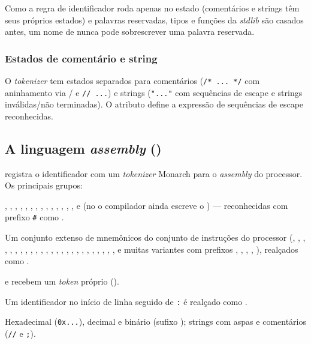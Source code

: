 \noindent
Como a regra de identificador roda apenas no estado  (comentários e
strings têm seus próprios estados) e palavras reservadas, tipos e funções da
\emph{stdlib} são casados antes, um nome de  nunca pode
sobrescrever uma palavra reservada.

\subsubsection{Estados de comentário e string}

O \emph{tokenizer} \cmm{} tem estados separados para comentários
(\lstinline|/* ... */| com aninhamento via / e
\lstinline|// ...|) e strings (\lstinline|"..."| com sequências de escape e
strings inválidas/não terminadas). O atributo  define a expressão
de sequências de escape reconhecidas.

\subsection{A linguagem \emph{assembly} ()}
\label{sec:editor-asm}

 registra o identificador  com um \emph{tokenizer}
Monarch para o \emph{assembly} do processor. Os principais grupos:

\begin{description}[leftmargin=*]
  \item[Diretivas.] , , , ,
        , , , ,
        , , , , ,
        ,  e  (no  o compilador
        ainda escreve o ) --- reconhecidas com prefixo \lstinline|#| como
        .
  \item[Instruções.] Um conjunto extenso de mnemônicos do conjunto de instruções
        do processor (, , , , ,
        , , , , , ,
        , , , , , ,
        , , , , , ,
        , , e muitas variantes com prefixos ,
        , , , ), realçados como
        .
  \item[Instruções de salto.]  e  recebem um \emph{token}
        próprio ().
  \item[Rótulos.] Um identificador no início de linha seguido de \lstinline|:|
        é realçado como .
  \item[Números.] Hexadecimal (\lstinline|0x...|), decimal e binário
        (sufixo ); strings com aspas e comentários (\lstinline|//| e
        \lstinline|;|).
\end{description}

